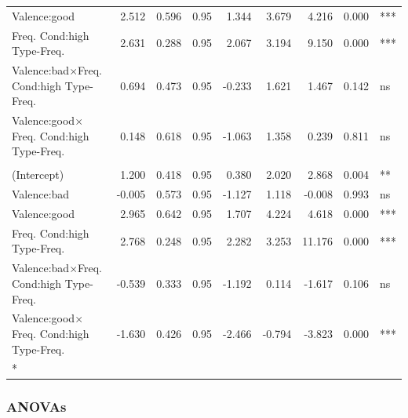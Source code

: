 \documentclass[
]{article}
\begin{document}
\begin{longtable}[t]{lrrrrrrrl}
\hspace{1em}Valence:good & 2.512 & 0.596 & 0.95 & 1.344 & 3.679 & 4.216 & 0.000 & ***\\
Freq.
Cond:high
\hspace{1em}Type-Freq. & 2.631 & 0.288 & 0.95 & 2.067 & 3.194 & 9.150 & 0.000 & ***\\
Valence:bad$\times$Freq.
Cond:high
\hspace{1em}Type-Freq. & 0.694 & 0.473 & 0.95 & -0.233 & 1.621 & 1.467 & 0.142 & ns\\
Valence:good$\times$Freq.
Cond:high
\hspace{1em}Type-Freq. & 0.148 & 0.618 & 0.95 & -1.063 & 1.358 & 0.239 & 0.811 & ns\\
\addlinespace[0.3em]
\multicolumn{9}{l}{\textbf{Prevalence - Testable}}\\
\hspace{1em}(Intercept) & 1.200 & 0.418 & 0.95 & 0.380 & 2.020 & 2.868 & 0.004 & **\\
\hspace{1em}Valence:bad & -0.005 & 0.573 & 0.95 & -1.127 & 1.118 & -0.008 & 0.993 & ns\\
\hspace{1em}Valence:good & 2.965 & 0.642 & 0.95 & 1.707 & 4.224 & 4.618 & 0.000 & ***\\
Freq.
Cond:high
\hspace{1em}Type-Freq. & 2.768 & 0.248 & 0.95 & 2.282 & 3.253 & 11.176 & 0.000 & ***\\
Valence:bad$\times$Freq.
Cond:high
\hspace{1em}Type-Freq. & -0.539 & 0.333 & 0.95 & -1.192 & 0.114 & -1.617 & 0.106 & ns\\
Valence:good$\times$Freq.
Cond:high
\hspace{1em}Type-Freq. & -1.630 & 0.426 & 0.95 & -2.466 & -0.794 & -3.823 & 0.000 & ***\\*
\end{longtable}

\subsubsection{ANOVAs}\label{anovas-1}
\end{document}

